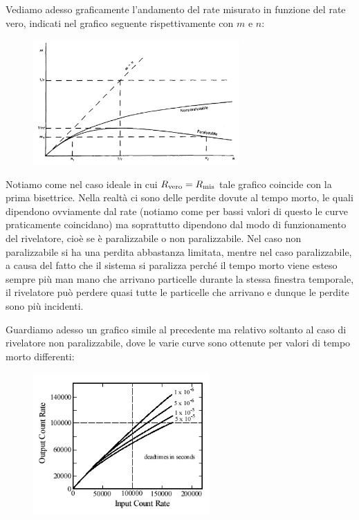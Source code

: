 Vediamo adesso graficamente l'andamento del rate misurato in funzione del rate vero, indicati nel grafico seguente rispettivamente con $m$ e $n$:
\begin{figure}[H]
   \centering
   \includegraphics[width=0.7\textwidth]{immagini/rate_vero_e_rate_misurato.png}
\end{figure}
Notiamo come nel caso ideale in cui $R_{\rm vero}=R_{\rm mis}$ tale grafico coincide con la prima bisettrice. Nella realtà ci sono delle perdite dovute al tempo morto, le quali dipendono ovviamente dal rate (notiamo come per bassi valori di questo le curve praticamente coincidano) ma soprattutto dipendono dal modo di funzionamento del rivelatore, cioè se è paralizzabile o non paralizzabile. Nel caso non paralizzabile si ha una perdita abbastanza limitata, mentre nel caso paralizzabile, a causa del fatto che il sistema si paralizza perché il tempo morto viene esteso sempre più man mano che arrivano particelle durante la stessa finestra temporale, il rivelatore può perdere quasi tutte le particelle che arrivano e dunque le perdite sono più incidenti.

Guardiamo adesso un grafico simile al precedente ma relativo soltanto al caso di rivelatore non paralizzabile, dove le varie curve sono ottenute per valori di tempo morto differenti:

\begin{figure}[H]
   \centering
   \includegraphics[width=0.6\textwidth]{immagini/rate_vero_e_rate_misurato_caso_non_paralizzabile.png}
\end{figure}


